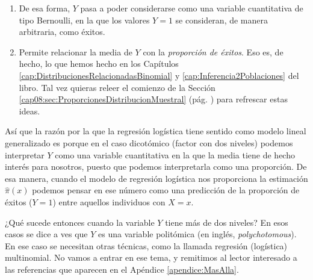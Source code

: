 	\begin{enumerate}
		\item De esa forma, $Y$ pasa a poder considerarse como una variable cuantitativa de tipo Bernoulli, en la que los valores $Y=1$ se consideran, de manera arbitraria, como éxitos.
		
		\item Permite relacionar la media de $Y$ con la {\em proporción de éxitos}.  Eso es, de hecho, lo que hemos hecho en los Capítulos \ref{cap:DistribucionesRelacionadasBinomial} y \ref{cap:Inferencia2Poblaciones} del libro. Tal vez quieras releer el comienzo de la Sección \ref{cap08:sec:ProporcionesDistribucionMuestral} (pág. \pageref{cap08:sec:ProporcionesDistribucionMuestral}) para refrescar estas ideas.
		
	\end{enumerate}
	
	Así que la razón por la que la regresión logística tiene sentido como modelo lineal generalizado es porque en el caso dicotómico  (factor con dos niveles) podemos interpretar $Y$ como una variable cuantitativa en la que la media tiene de hecho interés para nosotros, puesto que podemos interpretarla como una proporción. De esa manera, cuando el modelo de regresión logística nos proporciona la estimación $\hat\pi(x)$ podemos pensar en ese número como una predicción de la proporción de éxitos ($Y=1$) entre aquellos individuos con $X=x$.
	
	¿Qué sucede entonces cuando la variable $Y$ tiene más de dos niveles? En esos casos se dice a ves que $Y$ es una {\sf variable politómica} (en inglés, {\em polychotomous}). En ese caso se necesitan otras técnicas, como la llamada regresión (logística)  multinomial. No vamos a entrar en ese tema, y remitimos al lector interesado  a las referencias que aparecen en el Apéndice \ref{apendice:MasAlla}.
	
	
	
